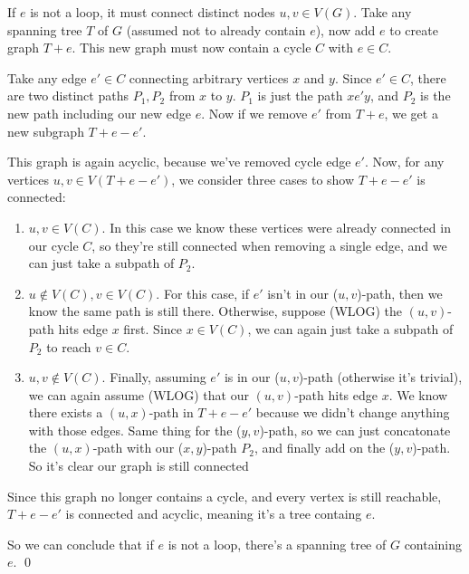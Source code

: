 \documentclass[11pt]{article}
\newcommand{\n}{\vspace{0.5cm}}
\begin{document}
\begin{itemize}
\begin{enumerate}[label=(\alph*)]
\begin{enumerate}
          If \(e\) is not a loop, it must connect distinct nodes \(u,v \in V(G)\).  Take any spanning tree \(T\) of \(G\) (assumed not to already contain \(e\)), now add \(e\) to create graph \(T+e\).  This new graph must now contain a cycle \(C\) with \(e \in C\). \n

          Take any edge \(e' \in C\) connecting arbitrary vertices \(x\) and \(y\).  Since \(e' \in C\), there are two distinct paths \(P_1, P_2\) from \(x\) to \(y\).  \(P_1\) is just the path \(xe'y\), and \(P_2\) is the new path including our new edge \(e\).  Now if we remove \(e'\) from \(T+e\), we get a new subgraph \(T+e-e'\).

          This graph is again acyclic, because we've removed cycle edge \(e'\).  Now, for any vertices \(u,v \in V(T+e-e')\), we consider three cases to show \(T+e-e'\) is connected:

            \begin{enumerate}
              \item \(u,v \in V(C)\).  In this case we know these vertices were already connected in our cycle \(C\), so they're still connected when removing a single edge, and we can just take a subpath of \(P_2\).
              \item \(u \not\in V(C), v \in V(C)\).  For this case, if \(e'\) isn't in our (\(u,v\))-path, then we know the same path is still there.  Otherwise, suppose (WLOG) the \((u,v)\)-path hits edge \(x\) first.  Since \(x \in V(C)\), we can again just take a subpath of \(P_2\) to reach \(v \in C\).
              \item \(u,v \not\in V(C)\).  Finally, assuming \(e'\) is in our (\(u,v\))-path (otherwise it's trivial), we can again assume (WLOG) that our \((u,v)\)-path hits edge \(x\).  We know there exists a \((u,x)\)-path in \(T+e-e'\) because we didn't change anything with those edges.  Same thing for the (\(y,v\))-path, so we can just concatonate the \((u,x)\)-path with our (\(x,y\))-path \(P_2\), and finally add on the (\(y,v\))-path.  So it's clear our graph is still connected
            \end{enumerate}

          Since this graph no longer contains a cycle, and every vertex is still reachable, \(T+e-e'\) is connected and acyclic, meaning it's a tree containg \(e\). \n

          So we can conclude that if \(e\) is not a loop, there's a spanning tree of \(G\) containing \(e\). \qed \n
          \end{enumerate}
    \end{enumerate}




\end{itemize}
\end{document}
